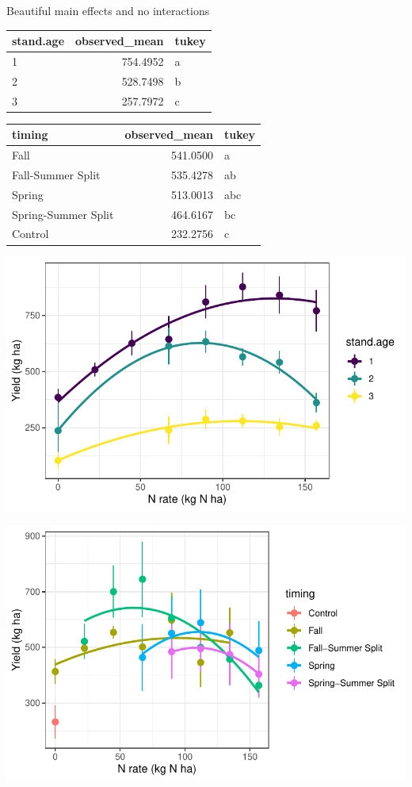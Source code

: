 \documentclass[
  letterpaper,
  DIV=11,
  numbers=noendperiod]{scrartcl}
\begin{document}
Beautiful main effects and no interactions

\begin{longtable}[]{@{}lrl@{}}
\toprule()
stand.age & observed\_mean & tukey \\
\midrule()
\endhead
1 & 754.4952 & a \\
2 & 528.7498 & b \\
3 & 257.7972 & c \\
\bottomrule()
\end{longtable}

\begin{longtable}[]{@{}lrl@{}}
\toprule()
timing & observed\_mean & tukey \\
\midrule()
\endhead
Fall & 541.0500 & a \\
Fall-Summer Split & 535.4278 & ab \\
Spring & 513.0013 & abc \\
Spring-Summer Split & 464.6167 & bc \\
Control & 232.2756 & c \\
\bottomrule()
\end{longtable}

\includegraphics{nrate_draft_files/figure-pdf/nrate-1.pdf}

\includegraphics{nrate_draft_files/figure-pdf/unnamed-chunk-21-1.pdf}
\end{document}

